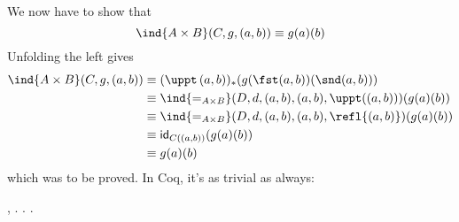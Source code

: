 We now have to show that
\[
\ind{A \times B}(C, g, (a, b)) 
\equiv g(a)(b)
\]
Unfolding the left gives
\begin{align*}
\ind{A \times B}(C, g, (a, b)) 
&\equiv
(\uppt\, (a, b))_{*}(g(\fst (a, b))(\snd (a, b)))
\\&\equiv
\ind{=_{A \times B}}(D, d, (a, b), (a, b), \uppt((a, b)))(g(a)(b))
\\&\equiv
\ind{=_{A \times B}}(D, d, (a, b), (a, b), \refl{(a, b)})
(g(a)(b))
\\&\equiv
\mathsf{id}_{C((a, b))}(g(a)(b))
\\&\equiv
g(a)(b)
\end{align*}
which was to be proved.  In Coq, it's as trivial as always: \begin{coqdoccode}
\coqdocemptyline
\coqdocindent{1.00em}
 \coqdockw{\ensuremath{\forall}}    ,      \coqdocnotation{=}   . . .\coqdoceol
\coqdocemptyline
\coqdocemptyline
\end{coqdoccode}


